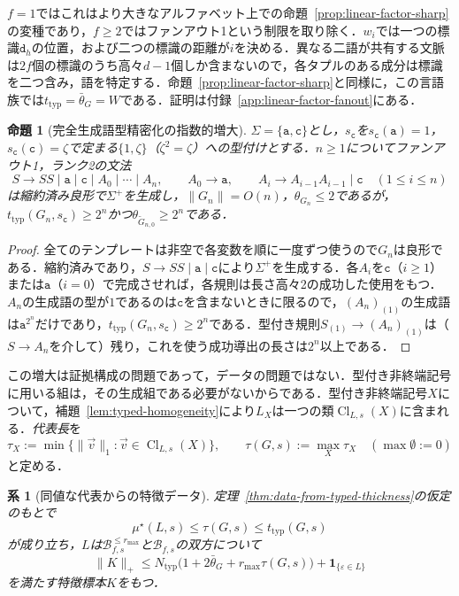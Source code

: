 \documentclass[11pt,a4paper]{ltjsarticle}
\numberwithin{equation}{section}
\theoremstyle{plain}
\newtheorem{proposition}[theorem]{命題}
\newtheorem{corollary}[theorem]{系}
\theoremstyle{definition}
\theoremstyle{remark}
\newcommand{\tuple}[1]{\vec{#1}}
\newcommand{\eps}{\varepsilon}
\begin{document}
$f=1$ではこれはより大きなアルファベット上での命題~\ref{prop:linear-factor-sharp}の変種であり，$f\ge2$ではファンアウト1という制限を取り除く．$w_i$では一つの標識$\mathtt d_h$の位置，および二つの標識の距離が$i$を決める．異なる二語が共有する文脈は$2f$個の標識のうち高々$d-1$個しか含まないので，各タプルのある成分は標識を二つ含み，語を特定する．命題~\ref{prop:linear-factor-sharp}と同様に，この言語族では$t_{\mathrm{typ}}=\bar\theta_G=W$である．証明は付録~\ref{app:linear-factor-fanout}にある．

\begin{proposition}[完全生成語型精密化の指数的増大]
\label{prop:typed-thickness-exponential}
$\Sigma=\{\mathtt a,\mathtt c\}$とし，$s_{\mathtt c}$を$s_{\mathtt c}(\mathtt a)=1$，$s_{\mathtt c}(\mathtt c)=\zeta$で定まる$\{1,\zeta\}$（$\zeta^2=\zeta$）への型付けとする．$n\ge1$についてファンアウト1，ランク2の文法
\[
 S\to SS\mid\mathtt a\mid\mathtt c\mid A_0\mid\cdots\mid A_n,\qquad
 A_0\to\mathtt a,\qquad
 A_i\to A_{i-1}A_{i-1}\mid\mathtt c\quad(1\le i\le n)
\]
は縮約済み良形で$\Sigma^+$を生成し，$\|G_n\|=O(n)$，$\theta_{G_n}\le2$であるが，$t_{\mathrm{typ}}(G_n,s_{\mathtt c})\ge2^n$かつ$\theta_{\widetilde G_{n,0}}\ge2^n$である．
\end{proposition}

\begin{proof}
全てのテンプレートは非空で各変数を順に一度ずつ使うので$G_n$は良形である．縮約済みであり，$S\to SS\mid\mathtt a\mid\mathtt c$により$\Sigma^+$を生成する．各$A_i$を$\mathtt c$（$i\ge1$）または$\mathtt a$（$i=0$）で完成させれば，各規則は長さ高々2の成功した使用をもつ．$A_n$の生成語の型が$1$であるのは$\mathtt c$を含まないときに限るので，$(A_n)_{(1)}$の生成語は$\mathtt a^{2^n}$だけであり，$t_{\mathrm{typ}}(G_n,s_{\mathtt c})\ge2^n$である．型付き規則$S_{(1)}\to(A_n)_{(1)}$は（$S\to A_n$を介して）残り，これを使う成功導出の長さは$2^n$以上である．
\end{proof}

この増大は証拠構成の問題であって，データの問題ではない．型付き非終端記号に用いる組は，その生成組である必要がないからである．型付き非終端記号$X$について，補題~\ref{lem:typed-homogeneity}により$L_X$は一つの類$\operatorname{Cl}_{L,s}(X)$に含まれる．\emph{代表長}を
\[
 \tau_X:=\min\{\|\tuple v\|_1:\tuple v\in\operatorname{Cl}_{L,s}(X)\},\qquad
 \tau(G,s):=\max_X\tau_X\quad(\max\emptyset:=0)
\]
と定める．

\begin{corollary}[同値な代表からの特徴データ]
\label{cor:distribution-representatives}
定理~\ref{thm:data-from-typed-thickness}の仮定のもとで
\[
 \mu^\star(L,s)\le\tau(G,s)\le t_{\mathrm{typ}}(G,s)
\]
が成り立ち，$L$は$\mathcal B^{\le r_{\max}}_{f,s}$と$\mathcal B_{f,s}$の双方について
\[
 \|K\|_+\le N_{\mathrm{typ}}\bigl(1+2\bar\theta_G+r_{\max}\tau(G,s)\bigr)
 +\mathbf 1_{\{\eps\in L\}}
\]
を満たす特徴標本$K$をもつ．
\end{corollary}
\end{document}
